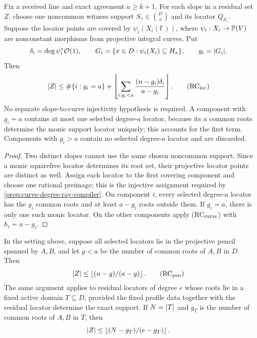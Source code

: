 \documentclass[11pt,a4paper]{amsart}
\numberwithin{equation}{section}
\theoremstyle{remark}
\newcommand{\F}{\mathbb F}\newcommand{\B}{\mathbb B}\newcommand{\K}{\mathbb K}\newcommand{\Z}{\mathbb Z}
\begin{document}
\begin{corollary}
\label{cor:automatic-locator-curve-ray}
Fix a received line and exact agreement \(a\ge k+1\).  For each slope in
a residual set \(Z\), choose one noncommon witness support
\(S_\gamma\in\binom Da\) and its locator \(Q_{S_\gamma}\).  Suppose the
locator points are covered by
\(\psi_i(X_i(\F))\), where
\(\psi_i:X_i\to\mathbb P(V)\) are nonconstant morphisms from projective
integral curves.  Put
\[
 \delta_i=\deg\psi_i^*\mathcal O(1),\qquad
 G_i=\{x\in D:\psi_i(X_i)\subseteq H_x\},
 \qquad g_i=\lvert G_i\rvert.
\]
Then
\[
 \abs Z\le
 \#\{i:g_i=a\}+
 \floor{\sum_{i:g_i<a}\frac{(n-g_i)\delta_i}{a-g_i}}. \tag{RC$_{\rm loc}$}
\]
No separate slope-to-curve injectivity hypothesis is required.  A
component with \(g_i=a\) contains at most one selected degree-\(a\)
locator, because its \(a\) common roots determine the monic support
locator uniquely; this accounts for the first term.  Components with
\(g_i>a\) contain no selected degree-\(a\) locator and are discarded.
\end{corollary}

\begin{proof}
Two distinct slopes cannot use the same chosen noncommon support.  Since a
monic squarefree locator determines its root set, their projective locator
points are distinct as well.  Assign each locator to the first covering
component and choose one rational preimage; this is the injective
assignment required by \cref{prop:curve-degree-ray-compiler}.  On
component \(i\), every selected degree-\(a\) locator has the \(g_i\)
common roots and at least \(a-g_i\) roots outside them.  If \(g_i=a\),
there is only one such monic locator.  On the other components apply
\textup{(RC$_{\rm curve}$)} with \(h_i=a-g_i\).
\end{proof}

\begin{corollary}
\label{cor:automatic-one-pencil-ray}
In the setting above, suppose all selected locators lie in the projective
pencil spanned by \(A,B\), and let \(g<a\) be the number of common roots
of \(A,B\) in \(D\).  Then
\[
                         \abs Z\le\floor{(n-g)/(a-g)}. \tag{RC$_{\rm pen}$}
\]
The same argument applies to residual locators of degree \(e\) whose roots
lie in a fixed active domain \(T\subseteq D\), provided the fixed profile
data together with the residual locator determine the exact support.  If
\(N=\lvert T\rvert\) and \(g_T\) is the number of common roots of \(A,B\) in
\(T\), then
\[
                         \lvert Z\rvert\le\left\lfloor (N-g_T)/(e-g_T)\right\rfloor.
\]
\end{corollary}
\end{document}
